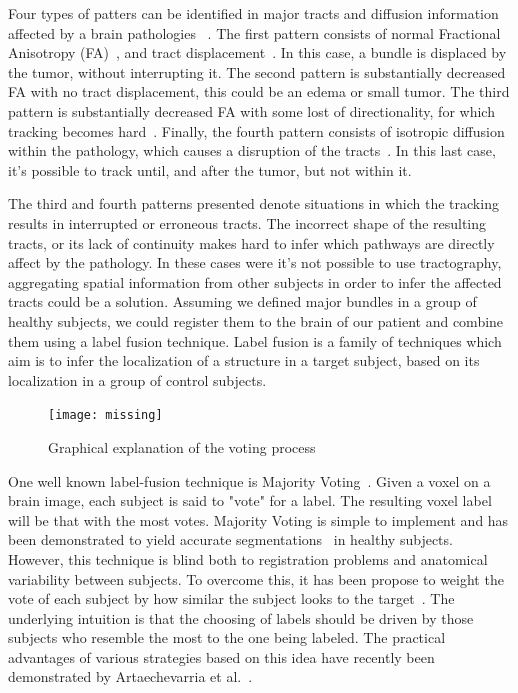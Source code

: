 Four types of patters can be identified in major tracts and diffusion
information affected by a brain pathologies~\cite{Pictorial2004} . The first
pattern consists of normal Fractional Anisotropy (FA)~\cite{Basser1996}, and
tract displacement~\cite{Pictorial2004}. In this case, a
bundle is displaced by the tumor, without interrupting it. The second pattern
is substantially decreased FA with no tract displacement, this could be
an edema or small tumor\cite{Schonberg2006, Huisman2009}.
The third pattern is substantially decreased FA with some lost of directionality,
for which tracking becomes hard~\cite{Schonberg2006, Pictorial2004}. Finally,
the fourth pattern consists of isotropic diffusion within the pathology,
which causes a disruption of the tracts~\cite{Pictorial2004}.
In this last case, it's possible to track until, and after the tumor, but not
within it.

The third and fourth patterns presented 
denote situations in which the tracking results in interrupted or erroneous
tracts. The incorrect shape of the resulting tracts, or its lack of continuity
makes hard to infer which pathways are directly affect by the pathology. In these
cases were it's not possible to use tractography, aggregating spatial information
from other subjects in order to infer the affected tracts could be a solution.
Assuming we defined major bundles in a group of healthy subjects, we could
register them to the brain of our patient and combine them using a label fusion
technique. Label fusion is a family of techniques which aim is to infer the
localization of a structure in a target subject, based on its
localization in a group of control subjects.

\begin{figure}[t]
    \texttt{[image: missing]}
    \caption{Graphical explanation of the voting process}
    \label{fig:weighted_diffusion}
\end{figure}

One well known label-fusion technique is Majority Voting~\cite{Xu1992}. Given a
voxel on a brain image, each subject is said to "vote" for a label. The resulting
voxel label will be that with the most votes. Majority Voting is simple to
implement and has been demonstrated to yield accurate segmentations~\cite{Asman2013}
in healthy subjects. However, this technique is blind both to registration problems
and anatomical variability between subjects. To overcome this, it has been propose
to weight the vote of each subject by how similar the subject looks to the
target~\cite{Sabuncu2010}. The underlying intuition is that the choosing of labels
should be driven by those subjects who resemble the most to the one being labeled.
The practical advantages of various strategies based on this idea have recently
been demonstrated by Artaechevarria et al.~\cite{Artaechevarria2009}.

